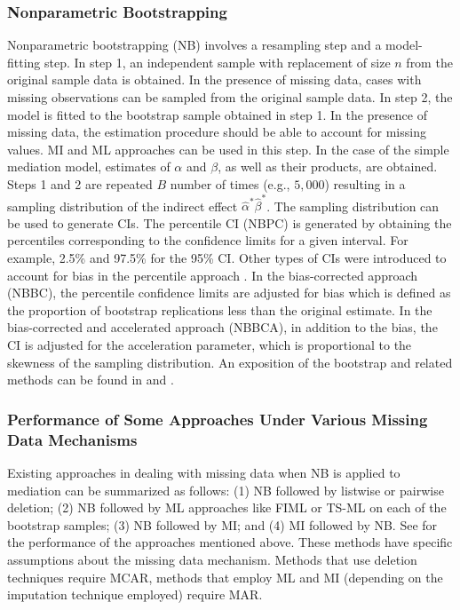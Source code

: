 \documentclass[man]{apa7}\usepackage[]{graphicx}\usepackage[]{xcolor}
\begin{document}
\subsubsection{Nonparametric Bootstrapping}

Nonparametric bootstrapping (NB) involves a resampling step
and a model-fitting step.
In step 1,
an independent sample with replacement of size ${n}$
from the original sample data is obtained.
In the presence of missing data,
cases with missing observations
can be sampled from the original sample data.
In step 2,
the model is fitted to the bootstrap sample obtained in step 1.
In the presence of missing data,
the estimation procedure should be able to account for missing values.
MI and ML approaches can be used in this step.
In the case of the simple mediation model,
estimates of ${\alpha}$ and ${\beta}$,
as well as their products,
are obtained.
Steps 1 and 2 are repeated $B$ number of times (e.g., ${5,000}$)
resulting in a sampling distribution
of the indirect effect ${\hat{\alpha}}^{\ast}{\hat{\beta}}^{\ast}$.
The sampling distribution can be used to generate CIs.
The percentile CI (NBPC)
is generated by obtaining the percentiles
corresponding to the confidence limits for a given interval.
For example,
2.5\% and 97.5\% for the 95\% CI.
Other types of CIs were introduced
to account for bias in the percentile approach
\parencite{Lib-Bootstrap-Efron-1987,
Lib-Bootstrap-Efron-1988}.
In the bias-corrected approach (NBBC),
the percentile confidence limits are adjusted for bias
which is defined as the proportion of bootstrap replications
less than the original estimate.
In the bias-corrected and accelerated approach (NBBCA),
in addition to the bias,
the CI is adjusted for the acceleration parameter,
which is proportional to the skewness of the sampling distribution.
An exposition of the bootstrap and related methods
can be found in
\Textcite{Lib-Bootstrap-Books-Efron-1993}
and
\Textcite{Lib-Bootstrap-Books-Davison-1997}.

\subsubsection{Performance of Some Approaches Under Various Missing Data Mechanisms}

Existing approaches in dealing with missing data when NB is applied to mediation
can be summarized as follows:
(1) NB followed by listwise or pairwise deletion;
(2) NB followed by ML approaches like FIML or TS-ML
on each of the bootstrap samples;
(3) NB followed by MI;
and (4) MI followed by NB.
See
\Textcite{Lib-Mediation-Missing-Data-Zhang-2012,
Lib-Mediation-Missing-Data-Wu-2013,
Lib-Mediation-Missing-Data-Zhang-2015}
for the performance of the approaches mentioned above.
These methods have specific assumptions about the missing data mechanism.
Methods that use deletion techniques require MCAR,
methods that employ ML and MI
(depending on the imputation technique employed) require MAR.
\end{document}
